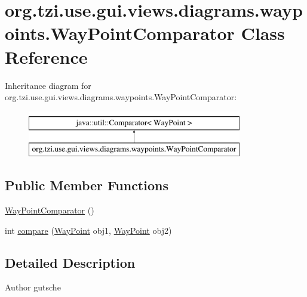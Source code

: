 \hypertarget{classorg_1_1tzi_1_1use_1_1gui_1_1views_1_1diagrams_1_1waypoints_1_1_way_point_comparator}{\section{org.\-tzi.\-use.\-gui.\-views.\-diagrams.\-waypoints.\-Way\-Point\-Comparator Class Reference}
\label{classorg_1_1tzi_1_1use_1_1gui_1_1views_1_1diagrams_1_1waypoints_1_1_way_point_comparator}
}
Inheritance diagram for org.\-tzi.\-use.\-gui.\-views.\-diagrams.\-waypoints.\-Way\-Point\-Comparator\-:\begin{figure}[H]
\begin{center}
\leavevmode
\includegraphics[height=2.000000cm]{classorg_1_1tzi_1_1use_1_1gui_1_1views_1_1diagrams_1_1waypoints_1_1_way_point_comparator}
\end{center}
\end{figure}
\subsection*{Public Member Functions}
\begin{DoxyCompactItemize}
\item 
\hyperlink{classorg_1_1tzi_1_1use_1_1gui_1_1views_1_1diagrams_1_1waypoints_1_1_way_point_comparator_a488e584af723e7a22368d36ceae9911b}{Way\-Point\-Comparator} ()
\item 
int \hyperlink{classorg_1_1tzi_1_1use_1_1gui_1_1views_1_1diagrams_1_1waypoints_1_1_way_point_comparator_a88af42c7206649ab3c3959b1f0ac3d89}{compare} (\hyperlink{classorg_1_1tzi_1_1use_1_1gui_1_1views_1_1diagrams_1_1waypoints_1_1_way_point}{Way\-Point} obj1, \hyperlink{classorg_1_1tzi_1_1use_1_1gui_1_1views_1_1diagrams_1_1waypoints_1_1_way_point}{Way\-Point} obj2)
\end{DoxyCompactItemize}


\subsection{Detailed Description}
\begin{DoxyAuthor}{Author}
gutsche 
\end{DoxyAuthor}


